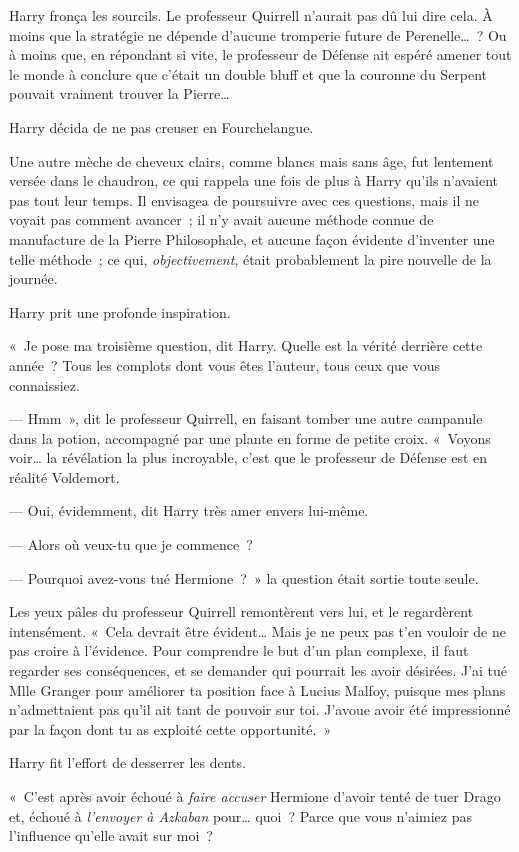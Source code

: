 Harry fronça les sourcils. Le professeur Quirrell n'aurait pas dû lui dire cela. À moins que la stratégie ne dépende d'aucune tromperie future de Perenelle…~? Ou à moins que, en répondant si vite, le professeur de Défense ait espéré amener tout le monde à conclure que c'était un double bluff et que la couronne du Serpent pouvait vraiment trouver la Pierre…

Harry décida de ne pas creuser en Fourchelangue.

Une autre mèche de cheveux clairs, comme blancs mais sans âge, fut lentement versée dans le chaudron, ce qui rappela une fois de plus à Harry qu'ils n'avaient pas tout leur temps. Il envisagea de poursuivre avec ces questions, mais il ne voyait pas comment avancer~; il n'y avait aucune méthode connue de manufacture de la Pierre Philosophale, et aucune façon évidente d'inventer une telle méthode~; ce qui, \emph{objectivement}, était probablement la pire nouvelle de la journée.

Harry prit une profonde inspiration.

«~Je pose ma troisième question, dit Harry. Quelle est la vérité derrière cette année~? Tous les complots dont vous êtes l'auteur, tous ceux que vous connaissiez.

--- Hmm~», dit le professeur Quirrell, en faisant tomber une autre campanule dans la potion, accompagné par une plante en forme de petite croix. «~Voyons voir… la révélation la plus incroyable, c'est que le professeur de Défense est en réalité Voldemort.

--- Oui, évidemment, dit Harry très amer envers lui-même.

--- Alors où veux-tu que je commence~?

--- Pourquoi avez-vous tué Hermione~?~» la question était sortie toute seule.

Les yeux pâles du professeur Quirrell remontèrent vers lui, et le regardèrent intensément. «~Cela devrait être évident… Mais je ne peux pas t'en vouloir de ne pas croire à l'évidence. Pour comprendre le but d'un plan complexe, il faut regarder ses conséquences, et se demander qui pourrait les avoir désirées. J'ai tué Mlle Granger pour améliorer ta position face à Lucius Malfoy, puisque mes plans n'admettaient pas qu'il ait tant de pouvoir sur toi. J'avoue avoir été impressionné par la façon dont tu as exploité cette opportunité.~»

Harry fit l'effort de desserrer les dents.

«~C'est après avoir échoué à \emph{faire accuser} Hermione d'avoir tenté de tuer Drago et, échoué à \emph{l'envoyer à Azkaban} pour… quoi~? Parce que vous n'aimiez pas l'influence qu'elle avait sur moi~?

